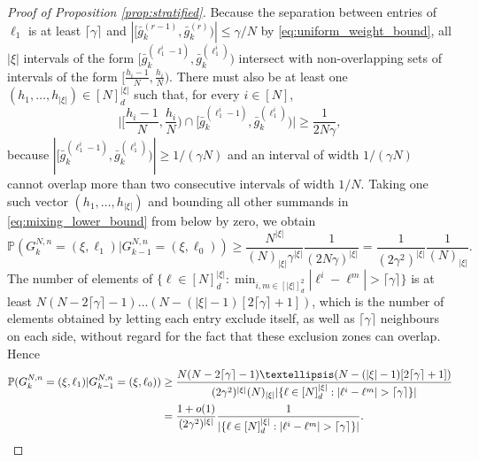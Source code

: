 \documentclass[10pt,a4paper]{amsart}
\newcommand{\bbP}{\mathbb{P}}
\begin{document}
\begin{proof}[Proof of Proposition \ref{prop:stratified}]
Because the separation between entries of $\ell_1$ is at least $\lceil \gamma \rceil$ and $| [ \bar{ g }_k^{ ( r - 1 ) }, \bar{ g }_k^{ ( r ) } ) | \leq \gamma / N$ by \eqref{eq:uniform_weight_bound}, all $| \xi |$ intervals of the form $[ \bar{ g }_k^{ ( \ell_1^i - 1 ) }, \bar{ g }_k^{ ( \ell_1^i ) } )$ intersect with non-overlapping sets of intervals of the form $[ \frac{ h_i - 1 }{ N }, \frac{ h_i }{ N } )$.
There must also be at least one $( h_1, \ldots, h_{ | \xi | } ) \in [ N ]_d^{ | \xi | }$ such that, for every $i \in [ N ]$,
\begin{equation*}
\Big| \Big[ \frac{ h_i - 1 }{ N }, \frac{ h_i }{ N } \Big) \cap [ \bar{ g }_k^{ ( \ell_1^i - 1 ) }, \bar{ g }_k^{ ( \ell_1^i ) } ) \Big| \geq \frac{ 1 }{ 2 N \gamma },
\end{equation*}
because $| [ \bar{ g }_k^{ ( \ell_1^i - 1 ) }, \bar{ g }_k^{ ( \ell_1^i ) } ) | \geq 1 / ( \gamma N )$ and an interval of width $1 / ( \gamma N )$ cannot overlap more than two consecutive intervals of width $1 / N$.
Taking one such vector $( h_1, \ldots, h_{ | \xi | } )$ and bounding all other summands in \eqref{eq:mixing_lower_bound} from below by zero, we obtain
\begin{equation*}
\bbP( G_k^{ N, n } = ( \xi, \ell_1 ) | G_{ k - 1 }^{ N, n } = ( \xi, \ell_0 )  ) \geq \frac{ N^{ | \xi | } }{ ( N )_{ | \xi | } \gamma^{ | \xi | } } \frac{ 1 }{ ( 2 N \gamma )^{ | \xi | } } = \frac{ 1 }{ ( 2 \gamma^2 )^{ | \xi | } } \frac{ 1 }{ ( N )_{ | \xi | } }.
\end{equation*}
The number of elements of $\{ \ell \in [ N ]_d^{ | \xi | } : \min_{i, m \in [ | \xi | ]_d^2} | \ell^i - \ell^m | > \lceil \gamma \rceil \}$ is at least $N ( N - 2 \lceil \gamma \rceil - 1 ) \ldots ( N - ( | \xi | - 1 ) [ 2 \lceil \gamma \rceil + 1 ] )$, which is the number of elements obtained by letting each entry exclude itself, as well as $\lceil \gamma \rceil$ neighbours on each side, without regard for the fact that these exclusion zones can overlap.
Hence
\begin{align}
\bbP( G_k^{ N, n } = ( \xi, \ell_1 ) | G_{ k - 1 }^{ N, n } = ( \xi, \ell_0 )  ) &\geq \frac{ N ( N - 2 \lceil \gamma \rceil - 1 ) \ldots ( N - ( | \xi | - 1 ) [ 2 \lceil \gamma \rceil + 1 ] ) }{ ( 2 \gamma^2 )^{ | \xi | }  ( N )_{ | \xi | } | \{ \ell \in [ N ]_d^{ | \xi | } : | \ell^i - \ell^m | > \lceil \gamma \rceil \} | } \notag \\
&= \frac{ 1 + o( 1 ) }{ ( 2 \gamma^2 )^{ | \xi | } } \frac{ 1 }{ | \{ \ell \in [ N ]_d^{ | \xi | } : | \ell^i - \ell^m | > \lceil \gamma \rceil \} | }. \label{eq:stratified_minorisation}

\end{align}
\end{proof}
\end{document}

